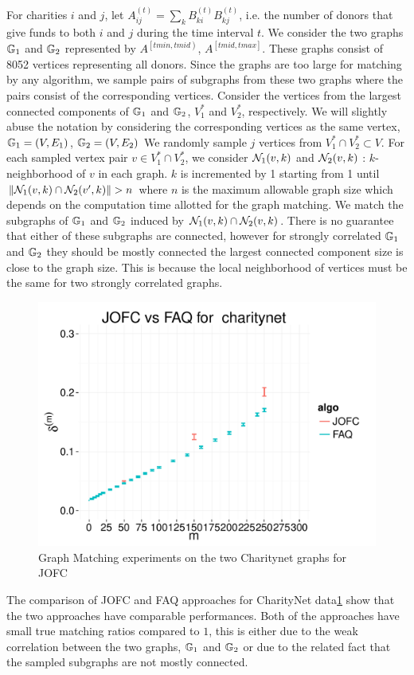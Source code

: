 \documentclass[12pt,oneside,final]{thesis}\usepackage[]{graphicx}\usepackage[]{color}
\begin{document}
For charities $i$ and $j$,
let $A_{ij}^{(t)}= \sum_{k}{B_{ki}^{(t)}B_{kj}^{(t)}}$, i.e. the number of donors that give funds to both $i$ and $j$  during the time interval $t$.
We consider the two graphs $\mathbb{G}_1$ and $\mathbb{G}_2$ represented by  $A^{\left[ tmin,tmid \right)}$, $A^{\left[ tmid,tmax\right]}$. These graphs consist of 8052   vertices representing all donors. Since the graphs are too large for matching by any algorithm, we sample pairs of subgraphs from these two graphs where the pairs consist of the corresponding vertices. Consider the vertices from the largest connected components of $\mathbb{G}_1$ and $\mathbb{G}_2$, $V_1^*$ and $V_2^*$, respectively. We will slightly abuse the  notation by considering the corresponding vertices as the same vertex, \ie $\mathbb{G}_1= (V,E_1)$, $\mathbb{G}_2= (V,E_2)$ We randomly sample $j$ vertices from  $V_1^* \cap V_2^* \subset V$. For each sampled vertex  pair $v \in V_1^* \cap V_2^*$, we consider $\mathcal{N}_1(v,k)$ and $\mathcal{N}_2(v,k)$ : $k$-neighborhood of $v$  in each graph. $k$ is incremented by 1 starting from 1 until   $\| \mcN_1(v,k) \cap\mcN_2(v',k)\|>n$ where $n$ is the maximum allowable graph size which depends on the computation time allotted for the graph matching. We match the  subgraphs of $\mathbb{G}_1$ and $\mathbb{G}_2$ induced by $\mathcal{N}_1(v,k) \cap\mathcal{N}_2(v,k)$. There is no guarantee that   either of these subgraphs are connected, however for strongly correlated $\mathbb{G}_1$ and $\mathbb{G}_2$ they should be mostly connected \ie the largest connected component size  is close to the graph size. This is because the local neighborhood of vertices must be the same for two strongly correlated graphs.

\begin{figure}
\includegraphics[scale=0.4]{charitynet_SGM_JOFCvsFAQ}
\caption{Graph Matching experiments on the two Charitynet graphs for JOFC \label{charitynet_graphmatch}}
\end{figure}
The comparison of JOFC and FAQ  approaches for CharityNet data\ref{charitynet_graphmatch} show that the two approaches have comparable performances. Both of the approaches have small true matching ratios compared to $1$, this is either  due to the weak correlation between the two graphs, $\mathbb{G}_1$ and $\mathbb{G}_2$ or due to the related fact that the sampled subgraphs are not mostly connected.
\end{document}
